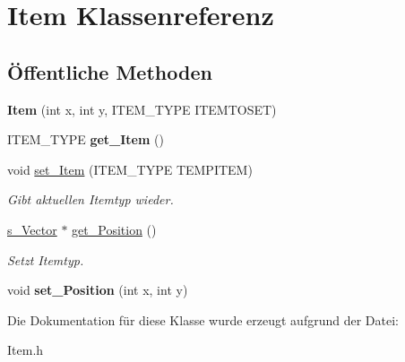 \hypertarget{class_item}{\section{Item Klassenreferenz}
\label{class_item}
}
\subsection*{Öffentliche Methoden}
\begin{DoxyCompactItemize}
\item 
\hypertarget{class_item_ae203ad5350de1aa73defd90973e055f0}{{\bfseries Item} (int x, int y, I\-T\-E\-M\-\_\-\-T\-Y\-P\-E I\-T\-E\-M\-T\-O\-S\-E\-T)}\label{class_item_ae203ad5350de1aa73defd90973e055f0}

\item 
\hypertarget{class_item_afcee83c2911215a53019b9182a37eb9f}{I\-T\-E\-M\-\_\-\-T\-Y\-P\-E {\bfseries get\-\_\-\-Item} ()}\label{class_item_afcee83c2911215a53019b9182a37eb9f}

\item 
\hypertarget{class_item_a00a562954be3b3ce018676aea84d9a75}{void \hyperlink{class_item_a00a562954be3b3ce018676aea84d9a75}{set\-\_\-\-Item} (I\-T\-E\-M\-\_\-\-T\-Y\-P\-E T\-E\-M\-P\-I\-T\-E\-M)}\label{class_item_a00a562954be3b3ce018676aea84d9a75}

\begin{DoxyCompactList}\small\item\em Gibt aktuellen Itemtyp wieder. \end{DoxyCompactList}\item 
\hypertarget{class_item_a8fbd971dcad6d5bffb887657db6f1a68}{\hyperlink{structs___vector}{s\-\_\-\-Vector} $\ast$ \hyperlink{class_item_a8fbd971dcad6d5bffb887657db6f1a68}{get\-\_\-\-Position} ()}\label{class_item_a8fbd971dcad6d5bffb887657db6f1a68}

\begin{DoxyCompactList}\small\item\em Setzt Itemtyp. \end{DoxyCompactList}\item 
\hypertarget{class_item_a71772937c1e153dbef03e583be74215a}{void {\bfseries set\-\_\-\-Position} (int x, int y)}\label{class_item_a71772937c1e153dbef03e583be74215a}

\end{DoxyCompactItemize}


Die Dokumentation für diese Klasse wurde erzeugt aufgrund der Datei\-:\begin{DoxyCompactItemize}
\item 
Item.\-h\end{DoxyCompactItemize}
